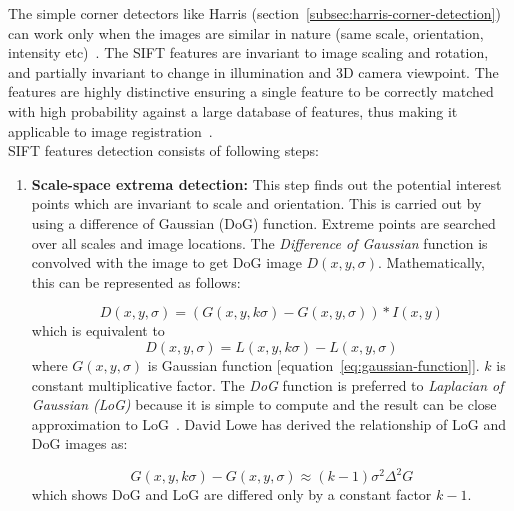 The simple corner detectors like Harris (section~\ref{subsec:harris-corner-detection}) can work only when the images are similar in  nature (same scale, orientation, intensity etc)~\cite{Lowe:04}. The SIFT features are invariant to image scaling and rotation, and partially invariant to change in illumination and 3D camera viewpoint. The features are highly distinctive ensuring a single feature to be correctly matched with high probability against a large database of features, thus making it applicable to image registration~\cite{Lowe:04}. \\ 

\noindent SIFT features detection consists of following steps:
\begin{enumerate}
	\item \textbf{Scale-space extrema detection:} This step finds out the potential interest points which are invariant to scale and orientation. This is carried out by using a difference of Gaussian (DoG) function. Extreme points are searched over all scales and image locations. The \emph{Difference of Gaussian} function is convolved with the image to get DoG image $D(x,y,\sigma)$. Mathematically, this can be represented as follows: 

\begin{equation}
D(x,y,\sigma)=(G(x,y,k \sigma)-G(x,y,\sigma))*I(x,y) 
\label{eq:state-space-image}
\end{equation}
which is equivalent to 
\begin{equation}
D(x,y,\sigma)=L(x,y,k \sigma)-L(x,y, \sigma)
\label{eq:equiv-state-space}
\end{equation}
where $G(x,y,\sigma)$ is Gaussian function [equation~\ref{eq:gaussian-function}]. $k$ is constant multiplicative factor. The \emph{DoG} function is preferred to \emph{Laplacian of Gaussian (LoG)} because it is simple to compute and the result can be close approximation to LoG~\cite{Lowe:04}. David Lowe has derived the relationship of LoG and DoG images as:

\begin{equation}
G(x,y,k \sigma)-G(x,y, \sigma) \approx (k-1)\sigma^2 \Delta^2G
\label{eq:dog-log}
\end{equation}
which shows DoG and LoG are differed only by a constant factor $k-1$. \\


\end{enumerate}
